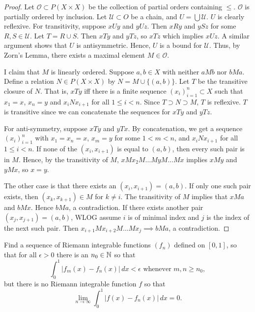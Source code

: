 \documentclass{article}
\begin{document}
\begin{proof}

Let $\mathcal O \subset P(X \times X)$ be the collection of partial orders containing $\le$. $\mathcal O$ is partially ordered by inclusion.  Let $\mathcal U \subset O$ be a chain, and $U = \bigcup \mathcal U$.  $U$ is clearly reflexive. For transitivity, suppose $xUy$ and $yUz$.  Then $xRy$ and $ySz$ for some $R,S \in \mathcal U$. Let $T = R \cup S$.  Then $xTy$ and $yTz$, so $xTz$ which implies $xUz$.  A similar argument shows that $U$ is antisymmetric. Hence, $U$ is a bound for $\mathcal U$. Thus, by Zorn's Lemma, there exists a maximal element $M \in \mathcal O$. 

I claim that $M$ is linearly ordered.  Suppose $a,b \in X$ with neither $aMb$ nor $bMa$.  Define a relation $N \in P(X \times X)$ by $N = M \cup \{(a,b)\}$.  Let $T$ be the transitive closure of $N$. That is, $xTy$ iff there is a finite sequence $(x_i)_{i=1}^n \subset X$ such that $x_1 = x$, $x_n = y$ and $x_iNx_{i+1}$ for all $1 \le i < n$. Since $T \supset N \supset M$, $T$ is reflexive.  $T$ is transitive since we can concatenate the sequences for $xTy$ and $yTz$. 

For anti-symmetry, suppose $xTy$ and $yTx$.  By concatenation, we get a sequence $(x_i)_{i=1}^n$ with $x_1 = x_n = x$, $x_m = y$ for some $1<m<n$, and $x_iNx_{i+1}$ for all $1 \le i < n$. If none of the $(x_i,x_{i+1})$ is equal to $(a,b)$, then every such pair is in $M$.  Hence, by the transitivity of $M$, $x M x_2 M \ldots M y M \ldots M x$ implies $x M y$ and $y M x$, so $x = y$.  

The other case is that there exists an $(x_i,x_{i+1}) = (a,b)$.  If only one such pair exists, then $(x_k,x_{k+1}) \in M$ for $k \neq i$.  The transitivity of $M$ implies that $xMa$ and $bMx$. Hence $bMa$, a contradiction.  If there exists another pair $(x_j, x_{j+1}) = (a,b)$, WLOG assume $i$ is of minimal index and $j$ is the index of the next such pair.  Then $x_{i+1} M x_{i+2} M \ldots M x_j \implies b M a$, a contradiction.

\end{proof}

 Find a sequence of Riemann integrable functions $(f_n)$ defined on $[0,1]$, so that for all $\epsilon > 0$ there is an $n_0 \in \mathbb{N}$ so that
$$ \int_0^1 |f_m(x) - f_n(x)| \,dx < \epsilon \text{ whenever } m,n \ge n_0, $$
but there is no Riemann integrable function $f$ so that
$$\lim_{n\to \infty} \int_0^1 |f(x) - f_n(x)| \,dx = 0. $$
\end{document}
